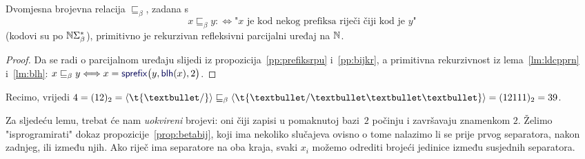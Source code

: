 \begin{korolar}[{name=[primitivna rekurzivnost relacije "biti prefiks"]}]\label{kor:preceqprnrpu}
Dvomjesna brojevna relacija $\sqsubseteq_\beta$, zadana s
\begin{equation}
    x\sqsubseteq_\beta y:\Longleftrightarrow\text{"$x$ je kod nekog prefiksa riječi čiji kod je $y$"}
\end{equation}
(kodovi su po ${\mathbb N}\Sigma_\beta^*$), primitivno je rekurzivan refleksivni parcijalni uređaj na ${\mathbb N}$.
\end{korolar}
\begin{proof}
    Da se radi o parcijalnom uređaju slijedi iz propozicija~\ref{pp:prefiksrpu} i~\ref{pp:bijkr}, a primitivna rekurzivnost iz lema~\ref{lm:ldcpprn} i~\ref{lm:blh}: $x\sqsubseteq_\beta y\Longleftrightarrow x=\f{sprefix}\bigl(y,\f{blh}(x),2\bigr)$.
\end{proof}

\begin{primjer}[{name=[prateća relacija "prefiks"]}]
Recimo, vrijedi $4=(12)_2=\kr{\t{\textbullet/}}\sqsubseteq_\beta\kr{\t{\textbullet/\textbullet\textbullet\textbullet}}=(12111)_2=39$.
\end{primjer}

Za sljedeću lemu, trebat će nam \emph{uokvireni} brojevi: oni čiji zapisi u pomaknutoj bazi~$2$ počinju i završavaju znamenkom $2$. Želimo "isprogramirati" dokaz propozicije~\ref{prop:betabij}, koji ima nekoliko slučajeva ovisno o tome nalazimo li se prije prvog separatora, nakon zadnjeg, ili između njih. Ako riječ ima separatore na oba kraja, svaki $x_i$ možemo odrediti brojeći jedinice između susjednih separatora.

